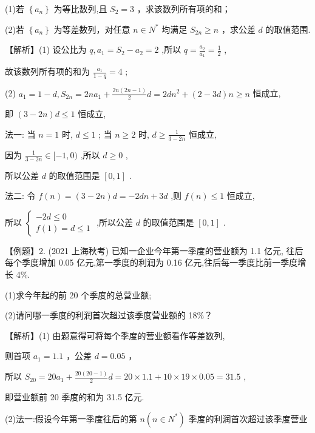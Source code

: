 \documentclass[10pt]{article}
\begin{document}
(1)若 \(\left\{  {a}_{n}\right\}\) 为等比数列,且 \({S}_{2} = 3\) ，求该数列所有项的和；

(2)若 \(\left\{  {a}_{n}\right\}\) 为等差数列，对任意 \(n \in  {N}^{ * }\) 均满足 \({S}_{2n} \geq  n\) ，求公差 \(d\) 的取值范围.

【解析】(1) 设公比为 \(q,{a}_{1} = {S}_{2} - {a}_{2} = 2\) ,所以 \(q = \frac{{a}_{2}}{{a}_{1}} = \frac{1}{2}\) ,

故该数列所有项的和为 \(\frac{{a}_{1}}{1 - q} = 4\) ;

(2) \({a}_{1} = 1 - d,{S}_{2n} = {2n}{a}_{1} + \frac{{2n}\left( {{2n} - 1}\right) }{2}d = {2d}{n}^{2} + \left( {2 - {3d}}\right) n \geq  n\) 恒成立,

即 \(\left( {3 - {2n}}\right) d \leq  1\) 恒成立,

法一: 当 \(n = 1\) 时, \(d \leq  1\) ; 当 \(n \geq  2\) 时, \(d \geq  \frac{1}{3 - {2n}}\) 恒成立,

因为 \(\frac{1}{3 - {2n}} \in  \lbrack  - 1,0)\) ,所以 \(d \geq  0\) ,

所以公差 \(d\) 的取值范围是 \(\left\lbrack  {0,1}\right\rbrack\) .

法二: 令 \(f\left( n\right)  = \left( {3 - {2n}}\right) d =  - {2dn} + {3d}\) ,则 \(f\left( n\right)  \leq  1\) 恒成立,

所以 \(\left\{  \begin{array}{l}  - {2d} \leq  0 \\  f\left( 1\right)  = d \leq  1 \end{array}\right.\) ,所以公差 \(d\) 的取值范围是 \(\left\lbrack  {0,1}\right\rbrack\) .

【例题】2. (2021 上海秋考) 已知一企业今年第一季度的营业额为 1.1 亿元, 往后每个季度增加 0.05 亿元,第一季度的利润为 0.16 亿元,往后每一季度比前一季度增长 4\%.

(1)求今年起的前 20 个季度的总营业额;

(2)请问哪一季度的利润首次超过该季度营业额的 18\%？

【解析】(1) 由题意得可将每个季度的营业额看作等差数列,

则首项 \({a}_{1} = {1.1}\) ，公差 \(d = {0.05}\) ，

所以 \({S}_{20} = {20}{a}_{1} + \frac{{20}\left( {{20} - 1}\right) }{2}d = {20} \times  {1.1} + {10} \times  {19} \times  {0.05} = {31.5}\) ,

即营业额前 20 季度的和为 31.5 亿元.

(2)法一:假设今年第一季度往后的第 \(n\left( {n \in  {N}^{ * }}\right)\) 季度的利润首次超过该季度营业
\end{document}
